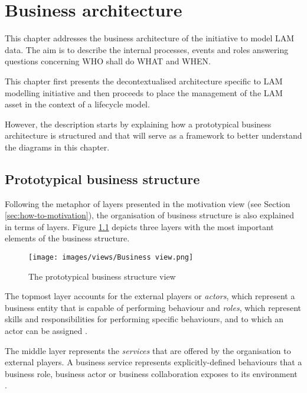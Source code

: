 \chapter{Business architecture}
\label{sec:business-architecture}
	
	This chapter addresses the business architecture of the initiative to model LAM data. The aim is to describe the internal processes, events and roles answering questions concerning WHO shall do WHAT and WHEN.
	
	This chapter first presents the decontextualised architecture specific to LAM modelling initiative and then proceeds to place the management of the LAM asset in the context of a lifecycle model.
	
	However, the description starts by explaining how a prototypical business architecture is structured and that will serve as a framework to better understand the diagrams in this chapter.
	
	\section{Prototypical business structure}
	
	Following the metaphor of layers presented in the motivation view (see Section \ref{sec:how-to-motivation}), the organisation of business structure is also explained in terms of layers. Figure \ref{fig:business-structure-protopypical} depicts three layers with the most important elements of the business structure. 
	
	\begin{figure}[h]
		\centering
		\texttt{[image: images/views/Business view.png]}
		\caption{The prototypical business structure view}
		\label{fig:business-structure-protopypical}
	\end{figure} 
	
	The topmost layer accounts for the external players or \textit{actors}, which represent a business entity that is capable of performing behaviour and \textit{roles}, which represent skills and responsibilities for performing specific behaviours, and to which an actor can be assigned \citep{archimate3.1}. 
	
	The middle layer represents the \textit{services} that are offered by the organisation to external players. A business service represents explicitly-defined behaviours that a business role, business actor or business collaboration exposes to its environment \citep{archimate3.1}.
	
